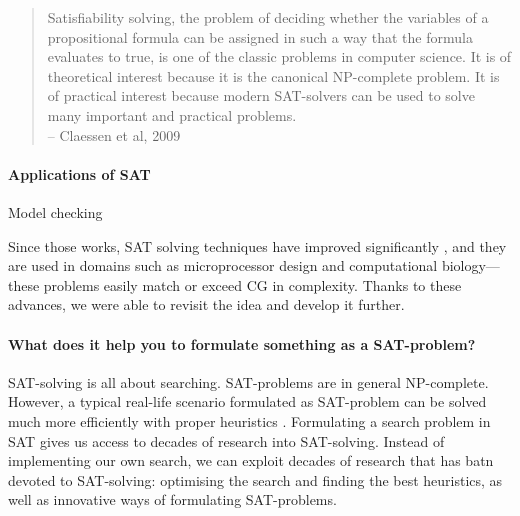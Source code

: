 \begin{quote}
Satisfiability solving, the problem of deciding whether the variables of a propositional formula can be assigned in such a way that the formula evaluates to true, is one of the classic problems in computer science. It is of theoretical interest because it is the canonical NP-complete problem. It is of practical interest because modern SAT-solvers can be used to solve many important and practical problems. \\
-- Claessen et al, 2009
\end{quote}


\paragraph{Applications of SAT}

Model checking

Since those works, SAT solving techniques have improved significantly \cite{marques_silva2010}, and they are used in domains such as microprocessor design and computational 
biology---these problems easily match or exceed CG in complexity. 
Thanks to these advances, we were able to revisit the idea and develop it
further. 


\paragraph{What does it help you to formulate something as a SAT-problem?}

SAT-solving is all about searching.
SAT-problems are in general NP-complete. However, a typical real-life scenario formulated as SAT-problem can be solved much more efficiently with proper heuristics \cite{claessen2009satpractice}.
Formulating a search problem in SAT gives us access to decades of research into SAT-solving. 
Instead of implementing our own search, we can exploit decades of research that has batn devoted to SAT-solving: optimising the search and finding the best heuristics, as well as innovative ways of formulating SAT-problems.